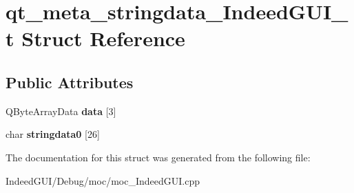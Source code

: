 \hypertarget{structqt__meta__stringdata___indeed_g_u_i__t}{}\section{qt\+\_\+meta\+\_\+stringdata\+\_\+\+Indeed\+G\+U\+I\+\_\+t Struct Reference}
\label{structqt__meta__stringdata___indeed_g_u_i__t}
\subsection*{Public Attributes}
\begin{DoxyCompactItemize}
\item 
\hypertarget{structqt__meta__stringdata___indeed_g_u_i__t_a4167f7ed469346fe224db05115bbc692}{}Q\+Byte\+Array\+Data {\bfseries data} \mbox{[}3\mbox{]}\label{structqt__meta__stringdata___indeed_g_u_i__t_a4167f7ed469346fe224db05115bbc692}

\item 
\hypertarget{structqt__meta__stringdata___indeed_g_u_i__t_a041332be18f463c8ee493796b3fe8ec7}{}char {\bfseries stringdata0} \mbox{[}26\mbox{]}\label{structqt__meta__stringdata___indeed_g_u_i__t_a041332be18f463c8ee493796b3fe8ec7}

\end{DoxyCompactItemize}


The documentation for this struct was generated from the following file\+:\begin{DoxyCompactItemize}
\item 
Indeed\+G\+U\+I/\+Debug/moc/moc\+\_\+\+Indeed\+G\+U\+I.\+cpp\end{DoxyCompactItemize}
